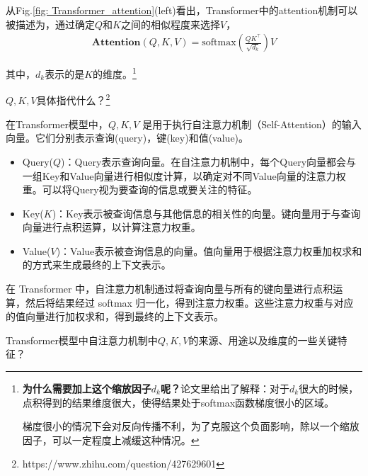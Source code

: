 \documentclass[letterpaper,10pt]{article}
\begin{document}
	从Fig.\ref{fig: Transformer_attention}(left)看出，Transformer中的attention机制可以被描述为，通过确定$Q$和$K$之间的相似程度来选择$V$，
	\begin{equation}
		\begin{aligned}
			\textbf{Attention}(Q,K,V)=\text{softmax}(\frac{QK^\top}{\sqrt{d_k}})V
		\end{aligned}
		\label{eq: Transformer_attention}
	\end{equation}
	
	其中，$d_k$表示的是$K$的维度。\footnote{\textbf{为什么需要加上这个缩放因子$d_k$呢？}论文里给出了解释：对于$d_k$很大的时候，点积得到的结果维度很大，使得结果处于softmax函数梯度很小的区域。
		
	梯度很小的情况下会对反向传播不利，为了克服这个负面影响，除以一个缩放因子，可以一定程度上减缓这种情况。}
	
	$Q, K, V$具体指代什么？\footnote{https://www.zhihu.com/question/427629601}
	
	在Transformer模型中，$Q, K, V$ 是用于执行自注意力机制（Self-Attention）的输入向量。它们分别表示查询(query)，键(key)和值(value)。
	
	\begin{itemize}
		\item {}
		
		Query($Q$)：Query表示查询向量。在自注意力机制中，每个Query向量都会与一组Key和Value向量进行相似度计算，以确定对不同Value向量的注意力权重。可以将Query视为要查询的信息或要关注的特征。
		
		\item {}
		
		Key($K$)：Key表示被查询信息与其他信息的相关性的向量。键向量用于与查询向量进行点积运算，以计算注意力权重。
		
		\item {}
		
		Value($V$)：Value表示被查询信息的向量。值向量用于根据注意力权重加权求和的方式来生成最终的上下文表示。	
	\end{itemize}
			
	在 Transformer 中，自注意力机制通过将查询向量与所有的键向量进行点积运算，然后将结果经过 softmax 归一化，得到注意力权重。这些注意力权重与对应的值向量进行加权求和，得到最终的上下文表示。
	
	Transformer模型中自注意力机制中$Q, K, V$的来源、用途以及维度的一些关键特征？
	
\end{document}
